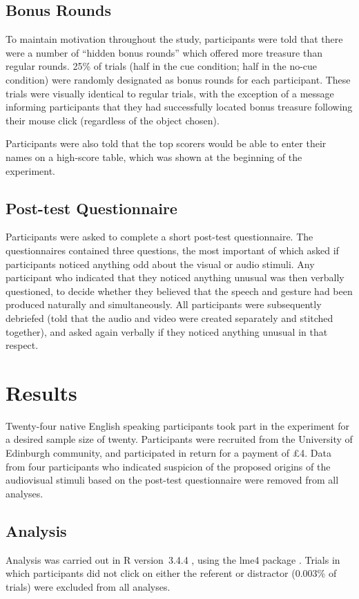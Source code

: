\documentclass[a4paper,man,natbib]{apa6}
\begin{document}
\subsection{Bonus Rounds}
To maintain motivation throughout the study, participants were told that there were a number of ``hidden bonus rounds'' which offered more treasure than regular rounds.
25\% of trials (half in the cue condition; half in the no-cue condition) were randomly designated as bonus rounds for each participant.
These trials were visually identical to regular trials, with the exception of a message informing participants that they had successfully located bonus treasure following their mouse click (regardless of the object chosen).

Participants were also told that the top scorers would be able to enter their names on a high-score table, which was shown at the beginning of the experiment. 

\subsection{Post-test Questionnaire}
Participants were asked to complete a short post-test questionnaire. 
The questionnaires contained three questions, the most important of which asked if participants noticed anything odd about the visual or audio stimuli.
Any participant who indicated that they noticed anything unusual was then verbally questioned, to decide whether they believed that the speech and gesture had been produced naturally and simultaneously.
All participants were subsequently debriefed (told that the audio and video were created separately and stitched together), and asked again verbally if they noticed anything unusual in that respect. 

\section{Results}
Twenty-four native English speaking participants took part in the experiment for a desired sample size of twenty. 
Participants were recruited from the University of Edinburgh community, and participated in return for a payment of \pounds{}4.
Data from four participants who indicated suspicion of the proposed origins of the audiovisual stimuli based on the post-test questionnaire were removed from all analyses.

\subsection{Analysis}
Analysis was carried out in R version~3.4.4 \citep{Rbase2017}, using the lme4 package \citep{Bates2015}. 
Trials in which participants did not click on either the referent or distractor (0.003\% of trials) were excluded from all analyses. 
\end{document}
